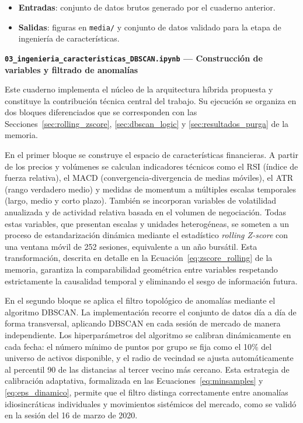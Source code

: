 \begin{itemize}
    \item \textbf{Entradas}: conjunto de datos brutos generado por el cuaderno anterior.
    \item \textbf{Salidas}: figuras en \texttt{media/} y conjunto de datos validado para la etapa de ingeniería de características.
\end{itemize}

\textbf{\texttt{03\_ingenieria\_caracteristicas\_DBSCAN.ipynb} --- Construcción de variables y filtrado de anomalías}

Este cuaderno implementa el núcleo de la arquitectura híbrida propuesta y constituye la contribución técnica central del trabajo. Su ejecución se organiza en dos bloques diferenciados que se corresponden con las Secciones~\ref{sec:rolling_zscore}, \ref{sec:dbscan_logic} y \ref{sec:resultados_purga} de la memoria.

En el primer bloque se construye el espacio de características financieras. A partir de los precios y volúmenes se calculan indicadores técnicos como el RSI (índice de fuerza relativa), el MACD (convergencia-divergencia de medias móviles), el ATR (rango verdadero medio) y medidas de momentum a múltiples escalas temporales (largo, medio y corto plazo). También se incorporan variables de volatilidad anualizada y de actividad relativa basada en el volumen de negociación. Todas estas variables, que presentan escalas y unidades heterogéneas, se someten a un proceso de estandarización dinámica mediante el estadístico \textit{rolling Z-score} con una ventana móvil de 252 sesiones, equivalente a un año bursátil. Esta transformación, descrita en detalle en la Ecuación~\ref{eq:zscore_rolling} de la memoria, garantiza la comparabilidad geométrica entre variables respetando estrictamente la causalidad temporal y eliminando el sesgo de información futura.

En el segundo bloque se aplica el filtro topológico de anomalías mediante el algoritmo DBSCAN. La implementación recorre el conjunto de datos día a día de forma transversal, aplicando DBSCAN en cada sesión de mercado de manera independiente. Los hiperparámetros del algoritmo se calibran dinámicamente en cada fecha: el número mínimo de puntos por grupo se fija como el 10\% del universo de activos disponible, y el radio de vecindad se ajusta automáticamente al percentil 90 de las distancias al tercer vecino más cercano. Esta estrategia de calibración adaptativa, formalizada en las Ecuaciones~\ref{eq:minsamples} y \ref{eq:eps_dinamico}, permite que el filtro distinga correctamente entre anomalías idiosincráticas individuales y movimientos sistémicos del mercado, como se validó en la sesión del 16 de marzo de 2020.


